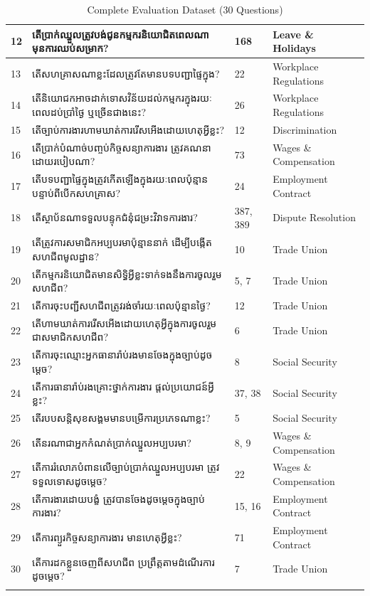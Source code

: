 \begin{longtable}{p{0.5cm} p{7.5cm} p{2.2cm} p{3cm}}
12 & {\khmerfont តើប្រាក់ឈ្នួលត្រូវបង់ជូនកម្មករនិយោជិតពេលណា មុនការឈប់សម្រាក?} & 168 & Leave \& Holidays \\ \midrule
13 & {\khmerfont តើសហគ្រាសណាខ្លះដែលត្រូវតែមានបទបញ្ជាផ្ទៃក្នុង?} & 22 & Workplace Regulations \\ \midrule
14 & {\khmerfont តើនិយោជកអាចដាក់ទោសវិន័យដល់កម្មករក្នុងរយៈពេលដប់ប្រាំថ្ងៃ ឬច្រើនជាងនេះ?} & 26 & Workplace Regulations \\ \midrule
15 & {\khmerfont តើច្បាប់ការងារហាមឃាត់ការរើសអើងដោយហេតុអ្វីខ្លះ?} & 12 & Discrimination \\ \midrule
16 & {\khmerfont តើប្រាក់បំណាច់បញ្ចប់កិច្ចសន្យាការងារ ត្រូវគណនាដោយរបៀបណា?} & 73 & Wages \& Compensation \\ \midrule
17 & {\khmerfont តើបទបញ្ជាផ្ទៃក្នុងត្រូវកើតឡើងក្នុងរយៈពេលប៉ុន្មានបន្ទាប់ពីបើកសហគ្រាស?} & 24 & Employment Contract \\ \midrule
18 & {\khmerfont តើស្ថាប័នណាទទួលបន្ទុកជំនុំជម្រះវិវាទការងារ?} & 387, 389 & Dispute Resolution \\ \midrule
19 & {\khmerfont តើត្រូវការសមាជិកអប្បបរមាប៉ុន្មាននាក់ ដើម្បីបង្កើតសហជីពមូលដ្ឋាន?} & 10 & Trade Union \\ \midrule
20 & {\khmerfont តើកម្មករនិយោជិតមានសិទ្ធិអ្វីខ្លះទាក់ទងនឹងការចូលរួមសហជីព?} & 5, 7 & Trade Union \\ \midrule
21 & {\khmerfont តើការចុះបញ្ជីសហជីពត្រូវរង់ចាំរយៈពេលប៉ុន្មានថ្ងៃ?} & 12 & Trade Union \\ \midrule
22 & {\khmerfont តើហាមឃាត់ការរើសអើងដោយហេតុអ្វីក្នុងការចូលរួមជាសមាជិកសហជីព?} & 6 & Trade Union \\ \midrule
23 & {\khmerfont តើការចុះឈ្មោះអ្នកធានារ៉ាប់រងមានចែងក្នុងច្បាប់ដូចម្ដេច?} & 8 & Social Security \\ \midrule
24 & {\khmerfont តើការធានារ៉ាប់រងគ្រោះថ្នាក់ការងារ ផ្ដល់ប្រយោជន៍អ្វីខ្លះ?} & 37, 38 & Social Security \\ \midrule
25 & {\khmerfont តើរបបសន្តិសុខសង្គមមានបម្រើការប្រភេទណាខ្លះ?} & 5 & Social Security \\ \midrule
26 & {\khmerfont តើនរណាជាអ្នកកំណត់ប្រាក់ឈ្នួលអប្បបរមា?} & 8, 9 & Wages \& Compensation \\ \midrule
27 & {\khmerfont តើការរំលោភបំពានលើច្បាប់ប្រាក់ឈ្នួលអប្បបរមា ត្រូវទទួលទោសដូចម្ដេច?} & 22 & Wages \& Compensation \\ \midrule
28 & {\khmerfont តើការងារដោយបង្ខំ ត្រូវបានចែងដូចម្ដេចក្នុងច្បាប់ការងារ?} & 15, 16 & Employment Contract \\ \midrule
29 & {\khmerfont តើការព្យួរកិច្ចសន្យាការងារ មានហេតុអ្វីខ្លះ?} & 71 & Employment Contract \\ \midrule
30 & {\khmerfont តើការដកខ្លួនចេញពីសហជីព ប្រព្រឹត្តតាមដំណើរការដូចម្ដេច?} & 7 & Trade Union \\
\bottomrule
\caption{Complete Evaluation Dataset (30 Questions)}
\label{tab:appendix_dataset}
\end{longtable}

